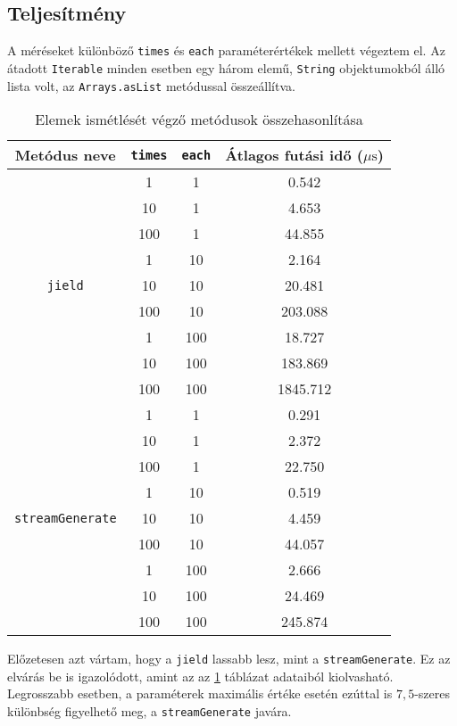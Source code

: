 \subsection{Teljesítmény}

A méréseket különböző \texttt{times} és \texttt{each} paraméterértékek mellett végeztem el. Az átadott \texttt{Iterable} minden esetben egy három elemű, \texttt{String} objektumokból álló lista volt, az \texttt{Arrays.asList} metódussal összeállítva. 

\begin{table}[h]
\captionsetup{justification=centering}
\centering
  \begin{tabular}{|| c | c | c | c ||}
  \hline
  Metódus neve & \texttt{times} & \texttt{each} & Átlagos futási idő ($\mu\mathrm{s}$) \\
  \hline \hline
  \multirow{9}{8.8em}{\texttt{jield}} & 1 & 1 & 0.542  \\
  & 10 & 1 & 4.653  \\
  & 100 & 1 & 44.855  \\
  & 1 & 10 & 2.164  \\
  & 10 & 10 & 20.481  \\
  & 100 & 10 & 203.088  \\
  & 1 & 100 & 18.727 \\
  & 10 & 100 & 183.869  \\
  & 100 & 100 & 1845.712 \\
  \hline
  \multirow{9}{8.8em}{\texttt{streamGenerate}} & 1 & 1 & 0.291  \\
  & 10 & 1 & 2.372  \\
  & 100 & 1 & 22.750  \\
  & 1 & 10 & 0.519  \\
  & 10 & 10 & 4.459  \\
  & 100 & 10 & 44.057  \\
  & 1 & 100 & 2.666  \\
  & 10 & 100 & 24.469  \\
  & 100 & 100 & 245.874  \\
  \hline
  \end{tabular}
\caption{Elemek ismétlését végző metódusok összehasonlítása}  
\label{table:repComp}
\end{table}

\pagebreak

Előzetesen azt vártam, hogy a \texttt{jield} lassabb lesz, mint a \texttt{streamGenerate}. Ez az elvárás be is igazolódott, amint az az \ref{table:repComp} táblázat adataiból kiolvasható. Legrosszabb esetben, a paraméterek maximális értéke esetén ezúttal is $7,5$-szeres különbség figyelhető meg, a \texttt{streamGenerate} javára. 

